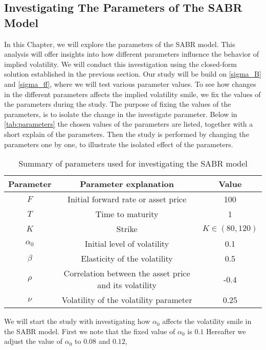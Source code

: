 \subsection{Investigating The Parameters of The SABR Model} \label{invest_sabr}
In this Chapter, we will explore the parameters of the SABR model. This analysis will offer insights into 
how different parameters influence the behavior of implied volatility. We will conduct this investigation using 
the closed-form solution established in the previous section. Our study will be build on  \autoref{sigma_B} and 
\autoref{sigma_ff}, where we will test various parameter values. To see how changes in the different parameters
affects the implied volatility smile, we fix the values of the parameters during the study. 
The purpose of fixing the values of the parameters, is to isolate the change in the investigate parameter. 
Below in \autoref{tab:parameters} the chosen values of the parameters are listed, together with a short
explain of the parameters. Then the study is performed by changing the parameters one by one, to illustrate the 
isolated effect of the parameters. 
\\
\begin{table}[H]
    \centering
    \begin{tabular}{ccc}
      \toprule
      \textbf{Parameter} & \textbf{Parameter explanation} & \textbf{Value} \\
      \midrule
      \rowcolor{lightgray!40} $F$ & Initial forward rate or asset price & 100 \\
      $T$ & Time to maturity & 1 \\
      \rowcolor{lightgray!40} $K$ & Strike & $K \in (80,120)$ \\
      $\alpha_0$ & Initial level of volatility & 0.1 \\
      \rowcolor{lightgray!40} $\beta$ & Elasticity of the volatility & 0.5 \\
      $\rho$ & Correlation between the asset price and its volatility & -0.4 \\
      \rowcolor{lightgray!40} $\nu$ & Volatility of the volatility parameter & 0.25 \\
      \bottomrule
    \end{tabular}
    \caption{Summary of parameters used for investigating the SABR model}
    \label{tab:parameters}
\end{table}
\noindent
We will start the study with investigating how $\alpha_0$ affects the volatility smile in the SABR model. 
First we note that the fixed value of $\alpha_0$ is $0.1$ Hereafter we adjust the value of $\alpha_0$ to $0.08$ and $0.12$,
